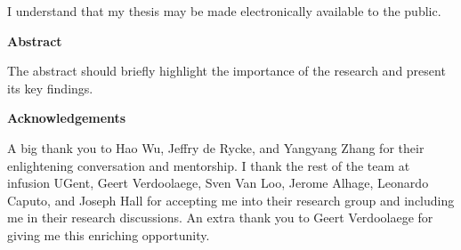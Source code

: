   \noindent
I understand that my thesis may be made electronically available to the public.

\cleardoublepage
{}    %

\begin{center}\textbf{Abstract}\end{center}

The abstract should briefly highlight the importance of the research and present its key findings. 

\cleardoublepage
{}    %

\begin{center}\textbf{Acknowledgements}\end{center}

A big thank you to Hao Wu, Jeffry de Rycke, and Yangyang Zhang for their enlightening conversation and mentorship. I thank the rest of the team at infusion UGent, Geert Verdoolaege, Sven Van Loo, Jerome Alhage, Leonardo Caputo, and Joseph Hall for accepting me into their research group and including me in their research discussions. An extra thank you to Geert Verdoolaege for giving me this enriching opportunity.
\cleardoublepage
{}    %



\renewcommand\contentsname{Table of Contents}
\tableofcontents
\cleardoublepage
{}    %

\listoffigures
\cleardoublepage
{}		%






